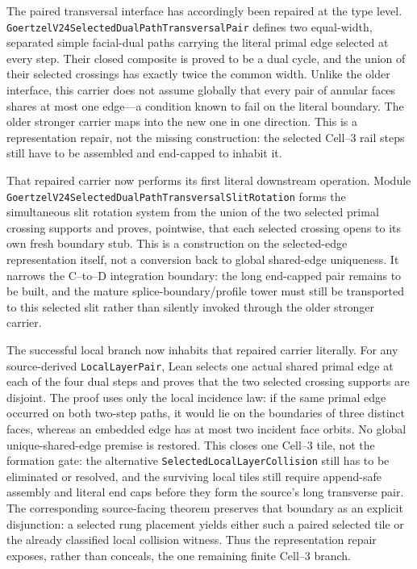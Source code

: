 \documentclass[11pt]{article}
\theoremstyle{definition}
\begin{document}
The paired transversal interface has accordingly been repaired at the type
level.  \texttt{GoertzelV24SelectedDualPathTransversalPair} defines two
equal-width, separated simple facial-dual paths carrying the literal primal
edge selected at every step.  Their closed composite is proved to be a dual
cycle, and the union of their selected crossings has exactly twice the common
width.  Unlike the older interface, this carrier does not assume globally
that every pair of annular faces shares at most one edge---a condition known
to fail on the literal boundary.  The older stronger carrier maps into the
new one in one direction.  This is a representation repair, not the missing
construction: the selected Cell--3 rail steps still have to be assembled and
end-capped to inhabit it.

That repaired carrier now performs its first literal downstream operation.
Module \texttt{GoertzelV24SelectedDualPathTransversalSlitRotation} forms the
simultaneous slit rotation system from the union of the two selected primal
crossing supports and proves, pointwise, that each selected crossing opens to
its own fresh boundary stub.  This is a construction on the selected-edge
representation itself, not a conversion back to global shared-edge
uniqueness.  It narrows the C--to--D integration boundary: the long end-capped
pair remains to be built, and the mature splice-boundary/profile tower must
still be transported to this selected slit rather than silently invoked
through the older stronger carrier.

The successful local branch now inhabits that repaired carrier literally.
For any source-derived \texttt{LocalLayerPair}, Lean selects one actual shared
primal edge at each of the four dual steps and proves that the two selected
crossing supports are disjoint.  The proof uses only the local incidence law:
if the same primal edge occurred on both two-step paths, it would lie on the
boundaries of three distinct faces, whereas an embedded edge has at most two
incident face orbits.  No global unique-shared-edge premise is restored.  This
closes one Cell--3 tile, not the formation gate: the alternative
\texttt{SelectedLocalLayerCollision} still has to be eliminated or resolved,
and the surviving local tiles still require append-safe assembly and literal
end caps before they form the source's long transverse pair.
The corresponding source-facing theorem preserves that boundary as an
explicit disjunction: a selected rung placement yields either such a paired
selected tile or the already classified local collision witness.  Thus the
representation repair exposes, rather than conceals, the one remaining finite
Cell--3 branch.
\end{document}
